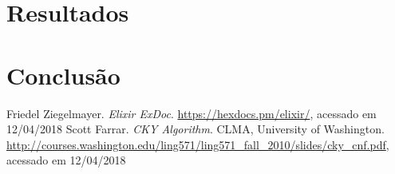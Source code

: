 \documentclass[conference]{IEEEtran}
\begin{document}
% 


% 


% 

\section{Resultados}


\section{Conclusão}


\begin{thebibliography}{1}
Friedel Ziegelmayer. \emph{Elixir ExDoc}. \url{https://hexdocs.pm/elixir/}, acessado em 12/04/2018
Scott Farrar. \emph{CKY Algorithm}. CLMA, University of Washington. \url{http://courses.washington.edu/ling571/ling571_fall_2010/slides/cky_cnf.pdf}, acessado em 12/04/2018
\end{thebibliography}
\end{document}
